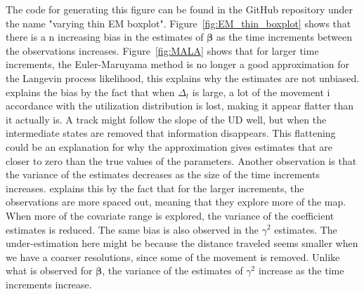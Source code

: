 The code for generating this figure can be found in the GitHub repository under the name "varying thin EM boxplot". Figure~\ref{fig:EM_thin_boxplot} shows that there is a n increasing bias in the estimates of $\bm \beta$ as the time increments between the observations increases. Figure~\ref{fig:MALA} shows that for larger time increments, the Euler-Maruyama method is no longer a good approximation for the Langevin process likelihood, this explains why the estimates are not unbiased. \parencite{michelot_langevin_2019} explains the bias by the fact that when $\Delta_t$ is large, a lot of the movement i accordance with the utilization distribution is lost, making it appear flatter than it actually is. A track might follow the slope of the UD well, but when the intermediate states are removed that information disappears. This flattening could be an explanation for why the approximation gives estimates that are closer to zero than the true values of the parameters. Another observation is that the variance of the estimates decreases as the size of the time increments increases. \parencite{michelot_langevin_2019} explains this by the fact that for the larger increments, the observations are more spaced out, meaning that they explore more of the map. When more of the covariate range is explored, the variance of the coefficient estimates is reduced. The same bias is also observed in the $\gamma^2$ estimates. The under-estimation here might be because the distance traveled seems smaller when we have a coarser resolutions, since some of the movement is removed. Unlike what is observed for $\bm \beta$, the variance of the estimates of $\gamma^2$ increase as the time increments increase.

